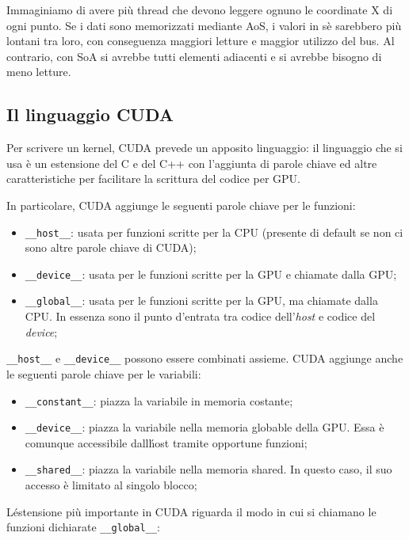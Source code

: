 \documentclass[12pt,a4paper,openright,twoside]{report}
\begin{document}
Immaginiamo di avere più thread che devono leggere ognuno le coordinate X di ogni punto. Se i dati sono memorizzati mediante AoS, i valori in sè sarebbero più lontani tra loro, con conseguenza maggiori letture e maggior utilizzo del bus. Al contrario, con SoA si avrebbe tutti elementi adiacenti e si avrebbe bisogno di meno letture.

\subsection{Il linguaggio CUDA}

Per scrivere un kernel, CUDA prevede un apposito linguaggio: il linguaggio che si usa è un estensione del C e del C++ con l'aggiunta di parole chiave ed altre caratteristiche per facilitare la scrittura del codice per GPU.

In particolare, CUDA aggiunge le seguenti parole chiave per le funzioni:

\begin{itemize}
    \item \verb|__host__|: usata per funzioni scritte per la CPU (presente di default se non ci sono altre parole chiave di CUDA);
    \item \verb|__device__|: usata per le funzioni scritte per la GPU e chiamate dalla GPU;
    \item \verb|__global__|: usata per le funzioni scritte per la GPU, ma chiamate dalla CPU. In essenza sono il punto d'entrata tra codice dell'\textit{host} e codice del \textit{device};
\end{itemize}

\verb|__host__| e \verb|__device__| possono essere combinati assieme. CUDA aggiunge anche le seguenti parole chiave per le variabili:

\begin{itemize}
    \item \verb|__constant__|: piazza la variabile in memoria costante;
    \item \verb|__device__|: piazza la variabile nella memoria globable della GPU. Essa è comunque accessibile dall\'host tramite opportune funzioni;
    \item \verb|__shared__|: piazza la variabile nella memoria shared. In questo caso, il suo accesso è limitato al singolo blocco;
\end{itemize}

L\'estensione più importante in CUDA riguarda il modo in cui si chiamano le funzioni dichiarate \verb|__global__|:
\end{document}
